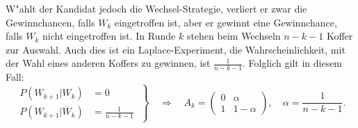 W"ahlt der Kandidat jedoch die Wechsel-Strategie, verliert er zwar
die Gewinnchancen, falls $W_k$ eingetroffen ist, aber er gewinnt
eine Gewinnchance, falls $W_k$ nicht eingetroffen ist.
In Runde $k$ stehen beim Wechseln $n-k-1$ Koffer zur Auswahl. Auch dies
ist ein Laplace-Experiment, die Wahrscheinlichkeit, mit der Wahl eines
anderen Koffers zu gewinnen, ist $\frac1{n-k-1}$. Folglich gilt in
diesem Fall:
\[
\left.
\begin{aligned}
P(W_{k+1}|W_k)
&=
0
\\
P(W_{k+1}|\overline{W}_k)
&=
\frac1{n-k-1}
\end{aligned}
\;
\right\}\quad\Rightarrow\quad
A_k=\begin{pmatrix}0&\alpha \\1&1-\alpha \end{pmatrix},\quad \alpha=\frac1{n-k-1}.
\]


